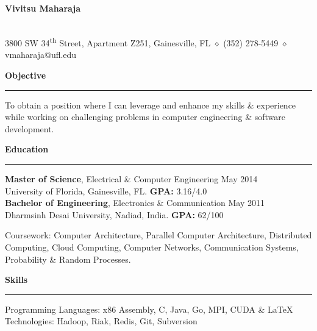 \documentclass[10pt, a4paper]{article}
\begin{document}
\begin{center}
\textbf{\Large Vivitsu Maharaja}
\date{}
\thispagestyle{empty}
\smallskip \\
3800 SW 34\textsuperscript{th} Street, Apartment Z251, Gainesville, FL $\diamond$ (352) 278-5449 $\diamond$ vmaharaja@ufl.edu
\end{center}

\textbf{Objective}
\smallskip
\hrule
To obtain a position where I can leverage and enhance my skills \& experience while working on challenging problems in computer engineering \& software development.

\textbf{Education}
\smallskip
\hrule
{\bf Master of Science}, Electrical \& Computer Engineering \hfill May 2014\\
University of Florida, Gainesville, FL. {\bf GPA:} 3.16/4.0 \\
{\bf Bachelor of Engineering}, Electronics \& Communication \hfill May 2011\\
Dharmsinh Desai University, Nadiad, India. {\bf GPA:} 62/100

Coursework: Computer Architecture, Parallel Computer Architecture, Distributed Computing, Cloud Computing, Computer Networks, Communication Systems, Probability \& Random Processes.

\textbf{Skills}
\smallskip
\hrule
Programming Languages: x86 Assembly, C, Java, Go, MPI, CUDA \& \LaTeX\ \\
Technologies: Hadoop, Riak, Redis, Git, Subversion
\end{document}
